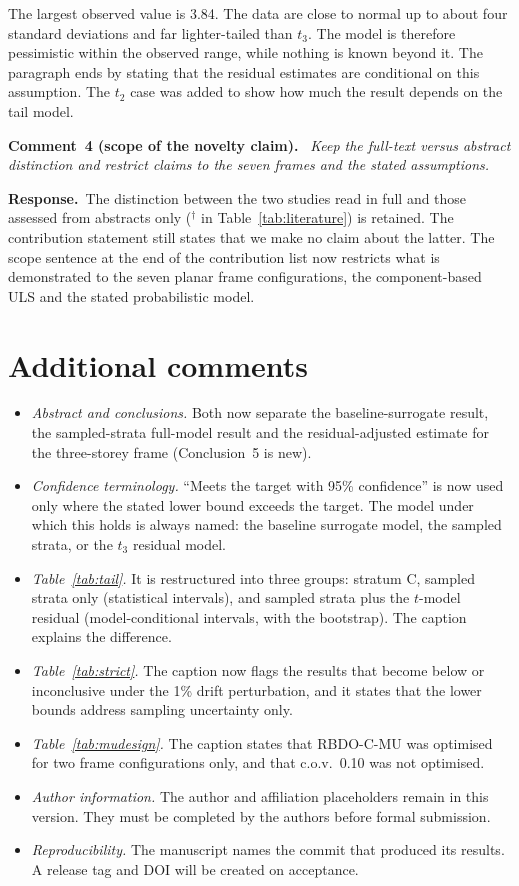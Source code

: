 \documentclass[11pt]{article}
\newenvironment{comment}[1]{\par\medskip\noindent\textbf{Comment~#1.}\ \itshape}{\par}
\newcommand{\resp}{\par\noindent\textbf{Response.}\ }
\begin{document}
The largest observed value is 3.84. The data are close to normal up to about four standard
deviations and far lighter-tailed than $t_3$. The model is therefore pessimistic within the
observed range, while nothing is known beyond it. The paragraph ends by stating that the residual
estimates are conditional on this assumption. The $t_2$ case was added to show how much the result
depends on the tail model.

\begin{comment}{4 (scope of the novelty claim)}
Keep the full-text versus abstract distinction and restrict claims to the seven frames and the stated
assumptions.
\end{comment}
\resp The distinction between the two studies read in full and those assessed from abstracts only
($^\dagger$ in Table~\ref{tab:literature}) is retained. The contribution statement still states that we
make no claim about the latter. The scope sentence at the end of the contribution list now restricts
what is demonstrated to the seven planar frame configurations, the component-based ULS and the stated
probabilistic model.

\section*{Additional comments}
\begin{itemize}[itemsep=0.2em]
\item \emph{Abstract and conclusions.} Both now separate the baseline-surrogate result, the
sampled-strata full-model result and the residual-adjusted estimate for the three-storey frame
(Conclusion~5 is new).
\item \emph{Confidence terminology.} ``Meets the target with 95\% confidence'' is now used only where
the stated lower bound exceeds the target. The model under which this holds is always named: the
baseline surrogate model, the sampled strata, or the $t_3$ residual model.
\item \emph{Table~\ref{tab:tail}.} It is restructured into three groups: stratum C, sampled strata
only (statistical intervals), and sampled strata plus the $t$-model residual (model-conditional
intervals, with the bootstrap). The caption explains the difference.
\item \emph{Table~\ref{tab:strict}.} The caption now flags the results that become below or
inconclusive under the 1\% drift perturbation, and it states that the lower bounds address sampling
uncertainty only.
\item \emph{Table~\ref{tab:mudesign}.} The caption states that RBDO-C-MU was optimised for two frame
configurations only, and that c.o.v.\ 0.10 was not optimised.
\item \emph{Author information.} The author and affiliation placeholders remain in this version. They
must be completed by the authors before formal submission.
\item \emph{Reproducibility.} The manuscript names the commit that produced its results. A release tag
and DOI will be created on acceptance.
\end{itemize}
\end{document}
